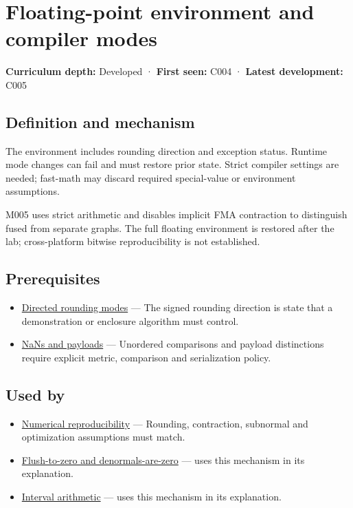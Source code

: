 \hypertarget{appendix-f11d1a521253}{}\label{referencestart:appendix-f11d1a521253}
\section{Floating-point environment and compiler modes}\label{appendix-f11d1a521253-floating-point-environment-and-compiler-modes}

\textbf{Curriculum depth:} Developed · \textbf{First seen:} C004 · \textbf{Latest development:} C005

\subsection{Definition and mechanism}\label{appendix-f11d1a521253-definition-and-mechanism}

The environment includes rounding direction and exception status. Runtime mode changes can fail and must restore prior state. Strict compiler settings are needed; fast-math may discard required special-value or environment assumptions.

M005 uses strict arithmetic and disables implicit FMA contraction to distinguish fused from separate graphs. The full floating environment is restored after the lab; cross-platform bitwise reproducibility is not established.

\subsection{Prerequisites}\label{appendix-f11d1a521253-prerequisites}

\begin{itemize}
\tightlist
\item
  \hyperref[appendix-637d164ae5ca]{Directed rounding modes} --- The signed rounding direction is state that a demonstration or enclosure algorithm must control.
\item
  \hyperref[appendix-d6607cc4c235]{NaNs and payloads} --- Unordered comparisons and payload distinctions require explicit metric, comparison and serialization policy.
\end{itemize}

\subsection{Used by}\label{appendix-f11d1a521253-used-by}

\begin{itemize}
\item
  \hyperref[appendix-5f1a2c3f97ff]{Numerical reproducibility} --- Rounding, contraction, subnormal and optimization assumptions must match.
\item
  \hyperref[appendix-e979eb012782]{Flush-to-zero and denormals-are-zero} --- uses this mechanism in its explanation.
\item
  \hyperref[appendix-1823a14330cb]{Interval arithmetic} --- uses this mechanism in its explanation.
\end{itemize}

